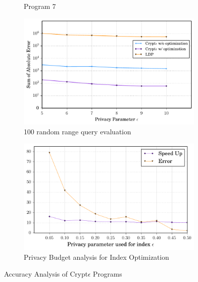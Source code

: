 \begin{figure}[ht]
\begin{subfigure}[b]{0.25\linewidth}
        \caption{Program 7}
        \label{fig:mouse}
    \end{subfigure}%
    \begin{subfigure}[b]{0.25\linewidth}
     \includegraphics[width=1\linewidth]{range.pdf}
        \caption{100 random range query evaluation}
        \end{subfigure}
        
        \begin{subfigure}[b]{0.25\linewidth}
     \includegraphics[width=1\linewidth]{index.pdf}
        \caption{Privacy Budget analysis for Index Optimization}
        \label{Index}
    \end{subfigure}%
   \caption{Accuracy Analysis of Crypt$\epsilon$ Programs}
\end{figure}




